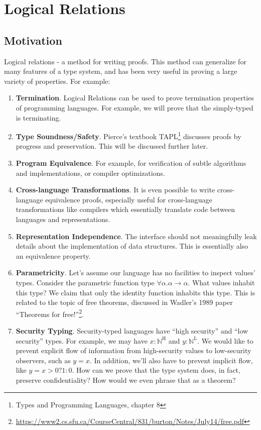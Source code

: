\section{Logical Relations}
\label{sec:logicalrels}

\subsection{Motivation}
Logical relations - a method for writing proofs. This method can generalize for many features of a type system, and has been
very useful in proving a large variety of properties. For example:
\begin{enumerate}
\item \textbf{Termination}. Logical Relations can be used to prove termination properties of programming
languages. For example, we will prove that the simply-typed \lc is terminating.
\item \textbf{Type Soundness/Safety}. Pierce's textbook TAPL\footnote{Types and Programming Languages, chapter 8} discusses
proofs by progress and preservation. This will be discussed further later.
\item \textbf{Program Equivalence}. For example, for verification of subtle algorithms and implementations, or compiler optimizations. 
\item \textbf{Cross-language Transformations}. It is even possible to write cross-language equivalence proofs, especially
useful for cross-language transformations like compilers which essentially translate code between languages and
representations.
\item \textbf{Representation Independence}. The interface should not meaningfully leak details about the implementation
of data structures. This is essentially also an equivalence property.
\item \textbf{Parametricity}. Let's assume our language has no facilities to inspect values' types. Consider
the parametric function type $\forall \alpha. \alpha \to \alpha$. What values inhabit this type? We claim
that only the identity function inhabits this type. This is related to the topic of free theorems, discussed in
Wadler's 1989 paper  ``Theorems for free!''\footnote{\href{https://www2.cs.sfu.ca/CourseCentral/831/burton/Notes/July14/free.pdf}
{https://www2.cs.sfu.ca/CourseCentral/831/burton/Notes/July14/free.pdf}}.
\item \textbf{Security Typing}. Security-typed languages have ``high security'' and ``low security'' types. For example,
we may have $x: \mathbb{N}^\mathrm{H}$ and $y: \mathbb{N}^\mathrm{L}$. We would like to prevent explicit flow
of information from high-security values to low-security observers, such as $y = x$. In addition, we'll also have to
prevent implicit flow, like $y = x > 0 ? 1 : 0$. How can we prove that the type system does, in fact, preserve
confidentiality? How would we even phrase that as a theorem?
\end{enumerate}

